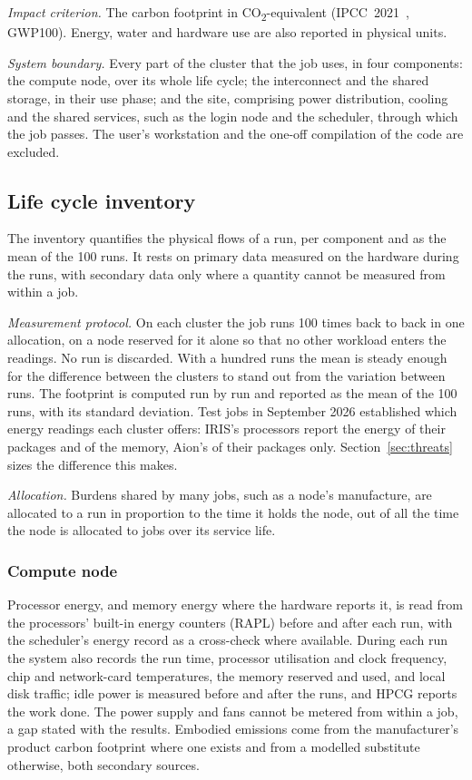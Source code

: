 \documentclass[conference,a4paper]{IEEEtran}
\begin{document}
\emph{Impact criterion.} The carbon footprint in CO\textsubscript{2}-equivalent
(IPCC~2021~\cite{ipcc2021}, GWP100). Energy, water and hardware use are also
reported in physical units.

\emph{System boundary.} Every part of the cluster that the job uses, in four
components: the compute node, over its whole life cycle; the interconnect and
the shared storage, in their use phase; and the site, comprising power
distribution, cooling and the shared services, such as the login node and the
scheduler, through which the job passes. The user's workstation and the one-off
compilation of the code are excluded.

\subsection{Life cycle inventory}\label{sec:lci}

The inventory quantifies the physical flows of a run, per component and as the
mean of the 100 runs. It rests
on primary data measured on the hardware during the runs, with secondary data
only where a quantity cannot be measured from within a job.

\emph{Measurement protocol.} On each cluster the job runs 100 times back to back
in one allocation, on a node reserved for it alone so that no other workload
enters the readings. No run is discarded. With a hundred runs the mean is steady
enough for the difference between the clusters to stand out from the variation
between runs. The footprint is computed run by run and reported as the mean of
the 100 runs, with its standard deviation. Test jobs in September 2026 established which energy readings each
cluster offers: IRIS's processors report the energy of their packages and of the memory,
Aion's of their packages only. Section~\ref{sec:threats} sizes the difference
this makes.

\emph{Allocation.} Burdens shared by many jobs, such as a node's manufacture, are
allocated to a run in proportion to the time it holds the node, out of all the
time the node is allocated to jobs over its service life.

\subsubsection{Compute node} Processor energy, and memory energy where the
hardware reports it, is read from the processors' built-in energy counters (RAPL)
before and after each run, with the scheduler's energy record as a
cross-check where available. During each run the system also records
the run time, processor utilisation and clock frequency, chip and network-card
temperatures, the memory reserved and used, and local disk traffic; idle power is
measured before and after the runs, and HPCG reports the work done. The
power supply and fans cannot be metered from within a job, a gap stated with the
results. Embodied emissions come from the manufacturer's product carbon
footprint where one exists and from a modelled substitute otherwise, both
secondary sources.
\end{document}
